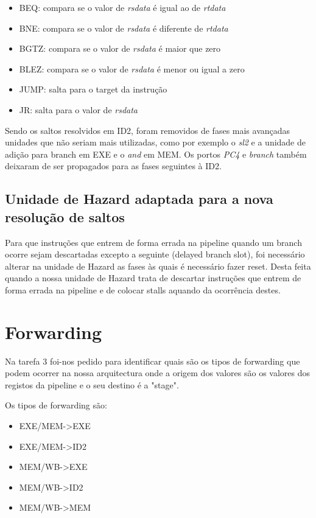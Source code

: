 \documentclass[pdftex,12pt,a4paper]{report}
\begin{document}
\begin{itemize}
\item BEQ: compara se o valor de \textit{rsdata} é igual ao de \textit{rtdata}
\item BNE: compara se o valor de \textit{rsdata} é diferente de \textit{rtdata} 
\item BGTZ: compara se o valor de \textit{rsdata} é maior que zero
\item BLEZ: compara se o valor de \textit{rsdata} é menor ou igual a zero
\item JUMP: salta para o target da instrução
\item JR: salta para o valor de \textit{rsdata}
\end{itemize} 

Sendo os saltos resolvidos em ID2, foram removidos de fases mais avançadas unidades que não seriam mais utilizadas, como por exemplo o \textit{sl2} e a unidade de adição para branch em EXE e o \textit{and} em MEM. Os portos \textit{PC4} e \textit{branch} também deixaram de ser propagados para as fases seguintes à ID2.

\subsection{Unidade de Hazard adaptada para a nova resolução de saltos}

Para que instruções que entrem de forma errada na pipeline quando um branch ocorre sejam descartadas excepto a seguinte (delayed branch slot), foi necessário alterar na unidade de Hazard as fases às quais é necessário fazer reset. Desta feita quando a nossa unidade de Hazard trata de descartar instruções que entrem de forma errada na pipeline e de colocar stalls aquando da ocorrência destes.

\section{Forwarding}

Na tarefa 3 foi-nos pedido para identificar quais são os tipos de forwarding que podem ocorrer na nossa arquitectura onde a origem dos valores são os valores dos registos da pipeline e o seu destino é a "stage".

Os tipos de forwarding são:
\begin{itemize}
\item EXE/MEM->EXE
\item EXE/MEM->ID2
\item MEM/WB->EXE
\item MEM/WB->ID2
\item MEM/WB->MEM
\end{itemize} 
\end{document}
